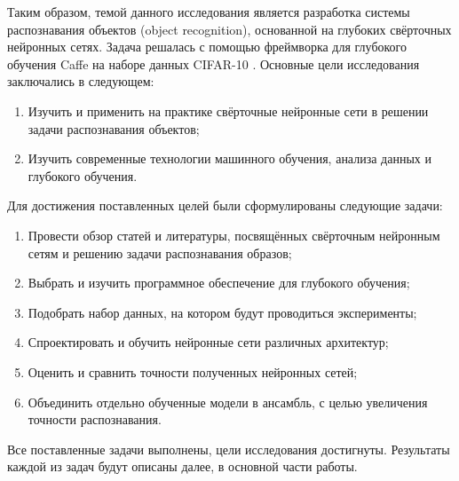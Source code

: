 Таким образом, темой данного исследования является разработка системы распознавания объектов 
(object recognition), основанной на глубоких свёрточных нейронных сетях. Задача решалась с помощью  
фреймворка для глубокого обучения Caffe \cite{jia2014caffe} на наборе данных CIFAR-10 
\cite{learningmultiple}. Основные цели исследования заключались в следующем:
\begin{enumerate}
    \item Изучить и применить на практике свёрточные нейронные сети в решении задачи распознавания 
    объектов;
    \item Изучить современные технологии машинного обучения, анализа данных и глубокого  
    обучения.
\end{enumerate}
Для достижения поставленных целей были сформулированы следующие задачи:
\begin{enumerate}
    \item Провести обзор статей и литературы, посвящённых свёрточным нейронным сетям и решению 
    задачи распознавания образов;
    \item Выбрать и изучить программное обеспечение для глубокого обучения;
    \item Подобрать набор данных, на котором будут проводиться эксперименты;
    \item Спроектировать и обучить нейронные сети различных архитектур;
    \item Оценить и сравнить точности полученных нейронных сетей;
    \item Объединить отдельно обученные модели в ансамбль, с целью увеличения точности 
    распознавания.
\end{enumerate}
Все поставленные задачи выполнены, цели исследования достигнуты. Результаты каждой из задач будут 
описаны далее, в основной части работы.
